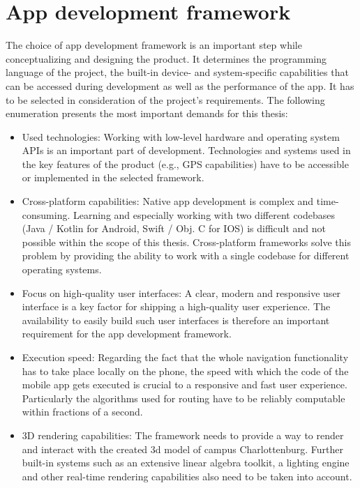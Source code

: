 \section{App development framework}
The choice of app development framework is an important step while conceptualizing and designing the product. It determines the programming language of the project, the built-in device- and system-specific capabilities that can be accessed during development as well as the performance of the app. It has to be selected in consideration of the project's requirements. The following enumeration presents the most important demands for this thesis:
\begin{itemize}
    \item Used technologies: Working with low-level hardware and operating system APIs is an important part of development. Technologies and systems used in the key features of the product (e.g., GPS capabilities) have to be accessible or implemented in the selected framework.
    \item Cross-platform capabilities: Native app development is complex and time-consuming. Learning and especially working with two different codebases (Java / Kotlin for Android, Swift / Obj. C for IOS) is difficult and not possible within the scope of this thesis. Cross-platform frameworks solve this problem by providing the ability to work with a single codebase for different operating systems.
    \item Focus on high-quality user interfaces: A clear, modern and responsive user interface is a key factor for shipping a high-quality user experience. The availability to easily build such user interfaces is therefore an important requirement for the app development framework. 
    \item Execution speed: Regarding the fact that the whole navigation functionality has to take place locally on the phone, the speed with which the code of the mobile app gets executed is crucial to a responsive and fast user experience. Particularly the algorithms used for routing have to be reliably computable within fractions of a second.
    \item 3D rendering capabilities: The framework needs to provide a way to render and interact with the created 3d model of campus Charlottenburg. Further built-in systems such as an extensive linear algebra toolkit, a lighting engine and other real-time rendering capabilities also need to be taken into account.
\end{itemize}

